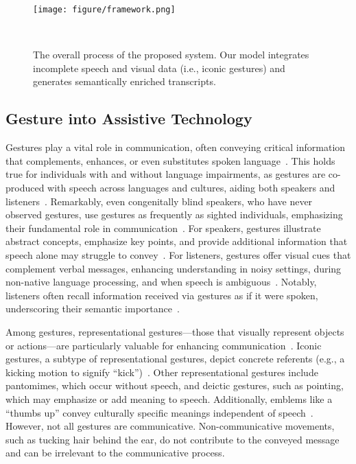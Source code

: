 \begin{figure*}[ht]
    \centering
    \texttt{[image: figure/framework.png]}
    \caption{The overall process of the proposed system. Our model integrates incomplete speech and visual data (i.e., iconic gestures) and generates semantically enriched transcripts.}%
    ~\label{fig:framework}
\end{figure*}

\subsection{Gesture into Assistive Technology}
Gestures play a vital role in communication, often conveying critical information that complements, enhances, or even substitutes spoken language~\cite{kita2009cross,kendon1994gestures,mcneill1990speech}. This holds true for individuals with and without language impairments, as gestures are co-produced with speech across languages and cultures, aiding both speakers and listeners~\cite{kita2009cross}. Remarkably, even congenitally blind speakers, who have never observed gestures, use gestures as frequently as sighted individuals, emphasizing their fundamental role in communication~\cite{iverson1998people}. For speakers, gestures illustrate abstract concepts, emphasize key points, and provide additional information that speech alone may struggle to convey~\cite{mcneill1990speech,kita2000representational,goldin2013gesture}. For listeners, gestures offer visual cues that complement verbal messages, enhancing understanding in noisy settings, during non-native language processing, and when speech is ambiguous~\cite{cook2009embodied,goldin1999role}. Notably, listeners often recall information received via gestures as if it were spoken, underscoring their semantic importance~\cite{cassell2000embodied,kelly1999offering}.

Among gestures, representational gestures—those that visually represent objects or actions—are particularly valuable for enhancing communication~\cite{mcneill1990speech}. Iconic gestures, a subtype of representational gestures, depict concrete referents (e.g., a kicking motion to signify “kick”)~\cite{novack2017gesture}. Other representational gestures include pantomimes, which occur without speech, and deictic gestures, such as pointing, which may emphasize or add meaning to speech\cite{kendon1994gestures}. Additionally, emblems like a “thumbs up” convey culturally specific meanings independent of speech~\cite{kendon1994gestures}. However, not all gestures are communicative. Non-communicative movements, such as tucking hair behind the ear, do not contribute to the conveyed message and can be irrelevant to the communicative process.

